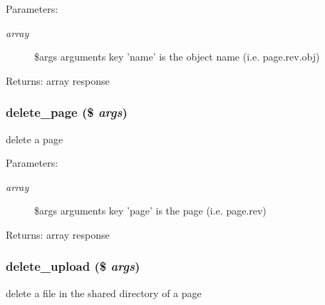 \begin{Desc}
\item[Parameters:]
\begin{description}
\item[{\em array}]\$args arguments key 'name' is the object name (i.e. page.rev.obj) \end{description}
\end{Desc}
\begin{Desc}
\item[Returns:]array response \end{Desc}
\hypertarget{module__glue_8inc_8php_f11541a6869804225793b82e54fa09fe}{
\subsubsection[{delete\_\-page}]{\setlength{\rightskip}{0pt plus 5cm}delete\_\-page (\$ {\em args})}}
\label{module__glue_8inc_8php_f11541a6869804225793b82e54fa09fe}


delete a page

\begin{Desc}
\item[Parameters:]
\begin{description}
\item[{\em array}]\$args arguments key 'page' is the page (i.e. page.rev) \end{description}
\end{Desc}
\begin{Desc}
\item[Returns:]array response \end{Desc}
\hypertarget{module__glue_8inc_8php_a4865d52ac449f8aaadb3a5d425f2efb}{
\subsubsection[{delete\_\-upload}]{\setlength{\rightskip}{0pt plus 5cm}delete\_\-upload (\$ {\em args})}}
\label{module__glue_8inc_8php_a4865d52ac449f8aaadb3a5d425f2efb}


delete a file in the shared directory of a page

